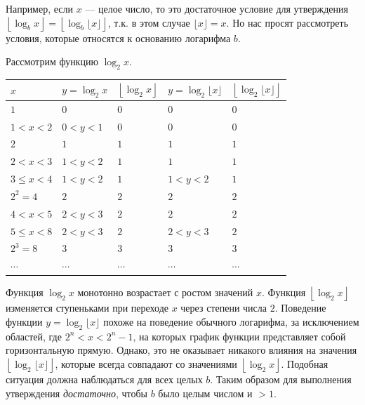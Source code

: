 \documentclass{book}
\begin{document}
Например, если $x$ --- целое число, то это достаточное условие для утверждения $\left\lfloor\log_{b}{x}\right\rfloor=\left\lfloor\log_{b}{\lfloor x\rfloor}\right\rfloor$, т.к. в этом случае $\lfloor x\rfloor=x$. Но нас просят рассмотреть условия, которые относятся к основанию логарифма $b$.

Рассмотрим функцию $\log_{2}{x}$.

\begin{tabularx}{1\textwidth} { 
  | >{\centering\arraybackslash}X 
  | >{\centering\arraybackslash}X
  | >{\centering\arraybackslash}X 
  | >{\centering\arraybackslash}X
  | >{\centering\arraybackslash}X | }
 \hline  $x$ & $y=\log_{2}{x}$ & $\left\lfloor\log_{2}{x}\right\rfloor$ & $y=\log_{2}{\lfloor x\rfloor}$ & $\left\lfloor\log_{2}{\lfloor x\rfloor}\right\rfloor$ \\
 \hline  $1$ & $0$ & $0$ & $0$ & $0$ \\
 \hline  $1<x<2$ & $0<y<1$ & $0$& $0$ & $0$ \\
 \hline  $2$ & $1$ & $1$& $1$ & $1$ \\
 \hline  $2<x<3$ & $1<y<2$ & $1$& $1$ & $1$ \\
 \hline  $3\leq x<4$ & $1<y<2$ & $1$& $1<y<2$ & $1$ \\
 \hline  $2^2=4$ & $2$ & $2$& $2$ & $2$ \\
 \hline  $4<x<5$ & $2<y<3$ & $2$& $2$ & $2$ \\
 \hline  $5\leq x<8$ & $2<y<3$ & $2$& $2<y<3$ & $2$ \\
 \hline  $2^3=8$ & $3$ & $3$& $3$ & $3$ \\
 \hline  $\cdots$ & $\cdots$ & $\cdots$ & $\cdots$ & $\cdots$ \\
 \hline
\end{tabularx}
 
Функция $\log_{2}{x}$ монотонно возрастает с ростом значений $x$. Функция $\left\lfloor\log_{2}{x}\right\rfloor$ изменяется ступеньками при переходе $x$ через степени числа $2$. Поведение функции $y=\log_{2}{\lfloor x\rfloor}$ похоже на поведение обычного логарифма, за исключением областей, где $2^n<x<2^n-1$, на которых график функции представляет собой горизонтальную прямую. Однако, это не оказывает никакого влияния на значения $\left\lfloor\log_{2}{\lfloor x\rfloor}\right\rfloor$, которые всегда совпадают со значениями $\left\lfloor\log_{2}{x}\right\rfloor$. Подобная ситуация должна наблюдаться для всех целых $b$. Таким образом для выполнения утверждения \emph{достаточно}, чтобы $b$ было целым числом и $>1$.
\end{document}
